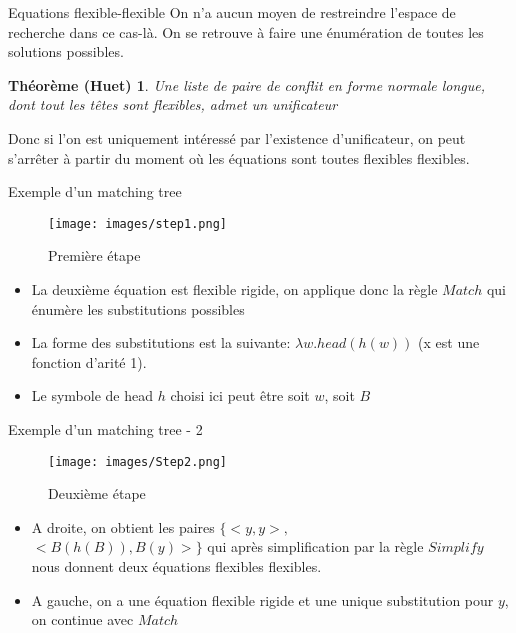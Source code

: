 \documentclass{beamer}
\begin{document}
\begin{frame}{Equations flexible-flexible}
On n'a aucun moyen de restreindre l'espace de recherche dans ce cas-là. On se retrouve à faire une énumération de toutes les solutions possibles.
\newtheorem{huetsaid}{Théorème (Huet)}
        \begin{huetsaid}
         Une liste de paire de conflit en forme normale longue, dont tout les têtes sont flexibles, admet un unificateur
        \end{huetsaid}
Donc si l'on est uniquement intéressé par l'existence d'unificateur, on peut s'arrêter à partir du moment où les équations sont toutes flexibles flexibles.

\end{frame}



\begin{frame}{Exemple d'un matching tree}

\begin{minipage}{0.5\textwidth}
\begin{figure}[H]
\texttt{[image: images/step1.png]}
\caption{\label{fig:blue_rectangle0} Première étape}
\end{figure}
\end{minipage} \hfill
\begin{minipage}{0.45\textwidth}
\begin{itemize}
\item La deuxième équation est flexible rigide, on applique donc la règle $Match$ qui énumère les substitutions possibles
\item La forme des substitutions est la suivante: $\lambda w. head (h(w))$ (x est une fonction d'arité 1).
\item Le symbole de head $h$ choisi ici peut être soit $w$, soit $B$
\end{itemize}
\end{minipage}
\end{frame}

\begin{frame}{Exemple d'un matching tree - 2}

\begin{minipage}{0.5\textwidth}
\begin{figure}[H]
\texttt{[image: images/Step2.png]}
\caption{\label{fig:blue_rectangle1} Deuxième étape}
\end{figure}
\end{minipage} \hfill
\begin{minipage}{0.45\textwidth}
\begin{itemize}
\item A droite, on obtient les paires $\{<y,y>,$\\
$<B(h(B)), B(y)>\}$ qui après simplification par la règle $Simplify$ nous donnent deux équations flexibles flexibles.
\item A gauche, on a une équation flexible rigide et une unique substitution pour $y$, on continue avec $Match$
\end{itemize}
\end{minipage}
\end{frame}
\end{document}
